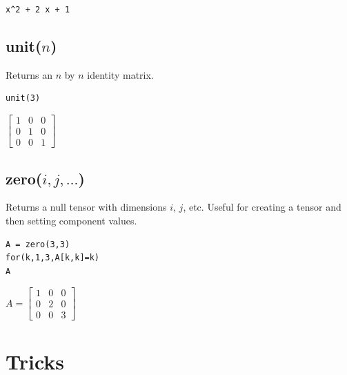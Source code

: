 \documentclass[12pt]{article}
\begin{document}
\noindent
\verb$x^2 + 2 x + 1$

\subsection*{unit($n$)}

Returns an $n$ by $n$ identity matrix.

{\color{blue}
\begin{verbatim}
unit(3)
\end{verbatim}
}

\noindent
$\displaystyle
\begin{bmatrix}
1 & 0 & 0
\\[1ex]
0 & 1 & 0
\\[1ex]
0 & 0 & 1
\end{bmatrix}
$

\subsection*{zero($i,j,\ldots$)}

Returns a null tensor with dimensions $i$, $j$, etc.
Useful for creating a tensor and then setting component values.

{\color{blue}
\begin{verbatim}
A = zero(3,3)
for(k,1,3,A[k,k]=k)
A
\end{verbatim}
}

\noindent
$\displaystyle
A=
\begin{bmatrix}
1 & 0 & 0
\\[1ex]
0 & 2 & 0
\\[1ex]
0 & 0 & 3
\end{bmatrix}
$

\newpage

\section{Tricks}
\end{document}

